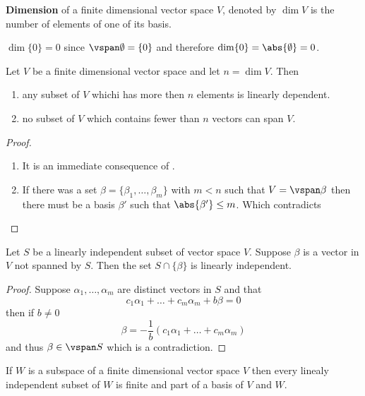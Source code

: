 \begin{definition}[Dimension]
    \textbf{Dimension} of a finite dimensional vector space \(V\), denoted by \( \dim V\) is the number of elements of one of its basis.
\end{definition}

\begin{example}
    \(\dim \{0\} = 0\) since \(\vspan \emptyset = \{0\}\) and therefore \(\dim \{0\} = \abs{\emptyset } = 0\).
\end{example}

\begin{corollary}
    Let \(V\) be a finite dimensional vector space and let \( n = \dim V\). Then 
    \begin{enumerate}
        \item any subset of \(V\) whichi has more then \(n\) elements is linearly dependent.
        \item no subset of \(V\) which contains fewer than \(n\) vectors can span \(V\).
    \end{enumerate}
\end{corollary}

\begin{proof}
    \begin{enumerate}
        \item It is an immediate consequence of .
        \item If there was a set \(\beta = \{\beta_1 , \dots , \beta_m\}\) with \(m < n\) such that \(V = \vspan \beta\) then there must be a basis \(\beta'\) such that \(\abs{\beta'} \leq m\). Which contradicts 
    \end{enumerate}
\end{proof}

\begin{lemma}
    Let \(S\) be a linearly independent subset of vector space \(V\). Suppose \(\beta\) is a vector in \(V\) not spanned by \(S\). Then the set \(S \cap \{\beta\}\) is linearly independent.
\end{lemma}

\begin{proof}
    Suppose \(\alpha_1, \dots ,\alpha_m \) are distinct vectors in \(S\) and that 
    \begin{equation}
        c_1 \alpha_1 + \dots + c_m \alpha_m + b \beta = 0
    \end{equation}
    then if \(b \neq 0\)
    \begin{equation*}
        \beta =-\dfrac{1}{b} (c_1 \alpha_1 + \dots + c_m \alpha_m )
    \end{equation*}
    and thus \(\beta \in \vspan S\) which is a contradiction.
\end{proof}

\begin{theorem}
    If \(W\) is a subspace of a finite dimensional vector space \(V\) then every linealy independent subset of \(W\) is finite and part of a basis of \(V\) and \(W\).
\end{theorem}